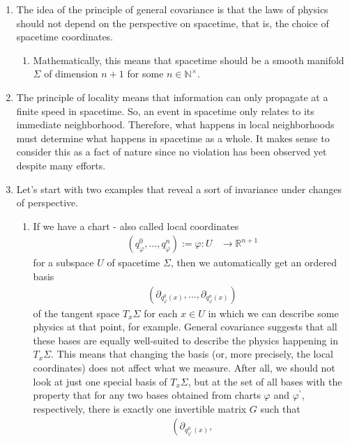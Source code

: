 \begin{enumerate}
\item[(1)]
The idea of the principle of general covariance is that the laws of physics should not depend on the perspective on spacetime, that is, the choice of spacetime coordinates.
\begin{enumerate}
\item[$\pmb{\hookrightarrow}$]
Mathematically, this means that spacetime should be a smooth manifold $\Sigma$ of dimension $n+1$ for some $n \in \mathbb{N}^{\times}$.
\end{enumerate}
\item[(2)]
The principle of locality means that information can only propagate at a finite speed in spacetime.
So, an event in spacetime only relates to its immediate neighborhood.
Therefore, what happens in local neighborhoods must determine what happens in spacetime as a whole.
It makes sense to consider this as a fact of nature since no violation has been observed yet despite many efforts.
\item[(3)]
Let's start with two examples that reveal a sort of invariance under changes of perspective.
\begin{enumerate}
\item[$\bullet$]
If we have a chart - also called local coordinates
\begin{align*}
  \left(
    q_{\varphi}^{0},
    \ldots,
    q_{\varphi}^{n}
  \right)
  :=
  \varphi
  \colon
  U
  &\rightarrow
  \mathbb{R}^{n+1}
\end{align*}
for a subspace $U$ of spacetime $\Sigma$, then we automatically get an ordered basis
\begin{align*}
  \left(
    \partial_{q_{\varphi}^{0}(x)},
    \ldots,
    \partial_{q_{\varphi}^{n}(x)}
  \right)
\end{align*}
of the tangent space $T_{x}\Sigma$ for each $x \in U$ in which we can describe some physics at that point, for example.
General covariance suggests that all these bases are equally well-suited to describe the physics happening in $T_{x}\Sigma$.
This means that changing the basis (or, more precisely, the local coordinates) does not affect what we measure.
After all, we should not look at just one special basis of $T_{x}\Sigma$, but at the set of all bases with the property that for any two bases obtained from charts $\varphi$ and $\varphi^{\backprime}$, respectively, there is exactly one invertible matrix $G$ such that
\begin{align*}
  \left(
    \partial_{q_{\varphi^{\backprime}}^{0}(x)},

\end{align*}
\end{enumerate}
\end{enumerate}
